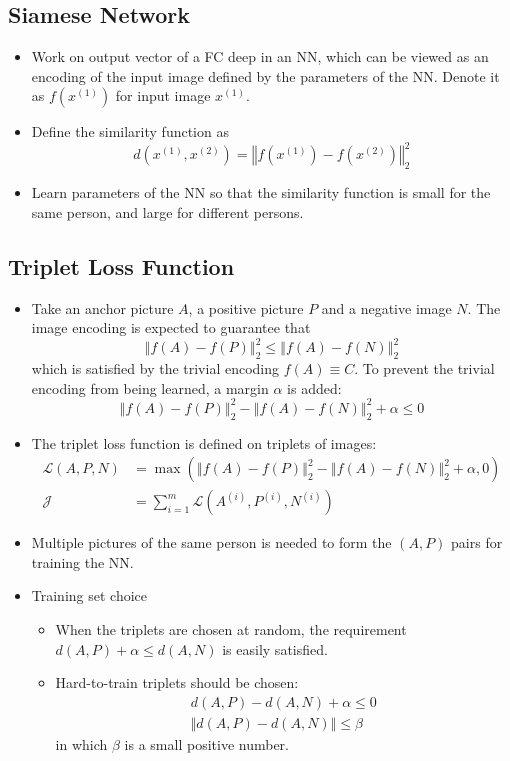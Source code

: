 \subsection{Siamese Network}
\begin{itemize}
  \item Work on output vector of a FC deep in an NN, which can be viewed as an encoding of the input image defined by the parameters of the NN. Denote it as $f\left(x^{(1)}\right)$ for input image $x^{(1)}$.
  \item Define the similarity function as 
  \[d\left(x^{(1)},x^{(2)}\right)=\left\Vert f\left(x^{(1)}\right)-f\left(x^{(2)}\right)\right\Vert^2_2\]
  \item Learn parameters of the NN so that the similarity function is small for the same person, and large for different persons. 
\end{itemize}
\subsection{Triplet Loss Function}
\begin{itemize}
  \item Take an anchor picture $A$, a positive picture $P$ and a negative image $N$. The image encoding is expected to guarantee that 
  \[\left\Vert f\left(A\right)-f\left(P\right)\right\Vert^2_2\le\left\Vert f\left(A\right)-f\left(N\right)\right\Vert^2_2\]
  which is satisfied by the trivial encoding $f(A)\equiv C$. To prevent the trivial encoding from being learned, a margin $\alpha$ is added:
  \[\left\Vert f\left(A\right)-f\left(P\right)\right\Vert^2_2-\left\Vert f\left(A\right)-f\left(N\right)\right\Vert^2_2+\alpha\le 0\]
  \item The triplet loss function is defined on triplets of images:
  \begin{align*}
    \mathcal{L}\left(A,P,N\right)&=\max\left(\left\Vert f\left(A\right)-f\left(P\right)\right\Vert^2_2-\left\Vert f\left(A\right)-f\left(N\right)\right\Vert^2_2+\alpha, 0\right)\\
    \mathcal{J}&=\displaystyle\sum_{i=1}^{m}\mathcal{L}\left(A^{(i)},P^{(i)},N^{(i)}\right)
  \end{align*}
  \item Multiple pictures of the same person is needed to form the $(A,P)$ pairs for training the NN.
  \item Training set choice
  \begin{itemize}
    \item When the triplets are chosen at random, the requirement $d\left(A,P\right)+\alpha\le d\left(A,N\right)$ is easily satisfied.  
    \item Hard-to-train triplets should be chosen:
    \begin{align*}
      d\left(A,P\right)-d\left(A,N\right)+\alpha\le 0\\
      \Vert d\left(A,P\right)-d\left(A,N\right)\Vert \le\beta
    \end{align*}
    in which $\beta$ is a small positive number.
  \end{itemize}
\end{itemize}
